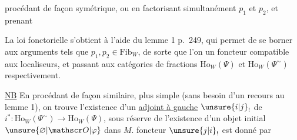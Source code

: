 procédant de façon symétrique, ou en factorisant simultanément $p_1$ et $p_2$, et prenant

La loi fonctorielle s'obtient à l'aide du lemme 1 p.~249, qui permet de se borner aux arguments
tels que $p_1,p_2\in\mathrm{Fib}_W$, de sorte que l'on  un foncteur
compatible aux localiseurs, et passant aux catégories de fractions $\mathrm{Ho}_W(\Psi)$ et $\mathrm{Ho}_W(\Psi^{\sim})$ respectivement.

\uline{NB} En procédant de façon similaire, plus simple (sans besoin d'un recours au lemme 1), on trouve l'existence d'un \uline{adjoint à gauche} $\unsure{i|j}_!$ de $i^*\colon\mathrm{Ho}_W(\Psi^{\sim})\to\mathrm{Ho}_W(\Psi)$, sous réserve de l'existence d'un objet initial $\unsure{\varnothing|\mathscr O|\varphi}$ dans $M$.  foncteur $\unsure{j|i}_!$ est donné par
